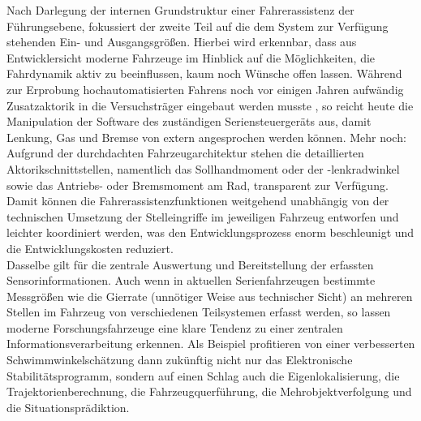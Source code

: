 Nach Darlegung der internen Grundstruktur einer Fahrerassistenz der Führungsebene, fokussiert der zweite Teil auf die dem System zur Verfügung stehenden Ein- und Ausgangsgrößen. Hierbei wird erkennbar, dass aus Entwicklersicht moderne Fahrzeuge im Hinblick auf die Möglichkeiten, die Fahrdynamik aktiv zu beeinflussen, kaum noch Wünsche offen lassen. Während zur Erprobung hochautomatisierten Fahrens noch vor einigen Jahren aufwändig Zusatzaktorik in die Versuchsträger eingebaut werden musste \cite{werivframe08, rauskolb2008caroline}, so reicht heute die Manipulation der Software des zuständigen Seriensteuergeräts aus, damit Lenkung, Gas und Bremse von extern angesprochen werden können. Mehr noch: Aufgrund der durchdachten Fahrzeugarchitektur stehen die detaillierten %
Aktorikschnittstellen, namentlich das Sollhandmoment oder der -lenkradwinkel sowie das Antriebs- oder Bremsmoment am Rad, transparent zur Verfügung. Damit können die Fahrerassistenzfunktionen weitgehend unabhängig von der technischen Umsetzung der Stelleingriffe im jeweiligen Fahrzeug entworfen und leichter koordiniert werden, was den Entwicklungsprozess enorm beschleunigt und die Entwicklungskosten reduziert. \\
Dasselbe gilt für die zentrale Auswertung und Bereitstellung der erfassten Sensorinformationen. Auch wenn in aktuellen Serienfahrzeugen bestimmte Messgrößen wie die Gierrate (unnötiger Weise aus technischer Sicht) an mehreren Stellen im Fahrzeug von verschiedenen Teilsystemen erfasst werden, so lassen moderne Forschungsfahrzeuge %
eine klare Tendenz zu einer zentralen Informationsverarbeitung erkennen. Als Beispiel profitieren von einer verbesserten Schwimmwinkelschätzung dann zukünftig nicht nur das Elektronische Stabilitätsprogramm, sondern auf einen Schlag auch die Eigenlokalisierung, die Trajektorienberechnung, die Fahrzeugquerführung, die Mehrobjektverfolgung und die Situationsprädiktion. \\

